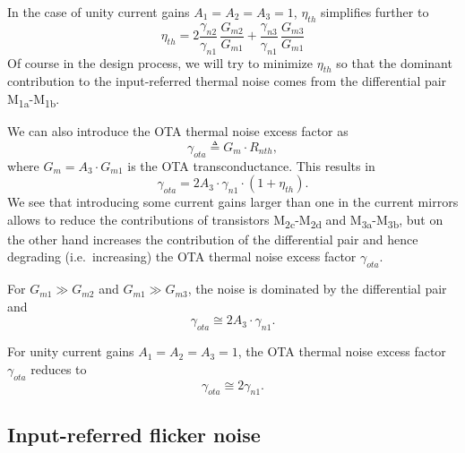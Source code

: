 \documentclass[
  a4paper,
  DIV=11,
  numbers=noendperiod]{scrreprt}
\begin{document}
In the case of unity current gains \(A_1=A_2=A_3=1\), \(\eta_{th}\)
simplifies further to \begin{equation}
  \eta_{th} = 2 \frac{\gamma_{n2}}{\gamma_{n1}}\,\frac{G_{m2}}{G_{m1}} + \frac{\gamma_{n3}}{\gamma_{n1}}\,\frac{G_{m3}}{G_{m1}}
\end{equation} Of course in the design process, we will try to minimize
\(\eta_{th}\) so that the dominant contribution to the input-referred
thermal noise comes from the differential pair
M\textsubscript{1a}-M\textsubscript{1b}.

We can also introduce the OTA thermal noise excess factor as
\begin{equation}
  \gamma_{ota} \triangleq G_m \cdot R_{nth},
\end{equation} where \(G_m = A_3 \cdot G_{m1}\) is the OTA
transconductance. This results in \begin{equation}
  \gamma_{ota} = 2 A_3 \cdot \gamma_{n1} \cdot (1 + \eta_{th}).
\end{equation} We see that introducing some current gains larger than
one in the current mirrors allows to reduce the contributions of
transistors M\textsubscript{2c}-M\textsubscript{2d} and
M\textsubscript{3a}-M\textsubscript{3b}, but on the other hand increases
the contribution of the differential pair and hence degrading
(i.e.~increasing) the OTA thermal noise excess factor \(\gamma_{ota}\).

For \(G_{m1} \gg G_{m2}\) and \(G_{m1} \gg G_{m3}\), the noise is
dominated by the differential pair and \begin{equation}
  \gamma_{ota} \cong 2 A_3 \cdot \gamma_{n1}.
\end{equation}

For unity current gains \(A_1=A_2=A_3=1\), the OTA thermal noise excess
factor \(\gamma_{ota}\) reduces to \begin{equation}
  \gamma_{ota} \cong 2 \gamma_{n1}.
\end{equation}

\subsection{Input-referred flicker
noise}\label{input-referred-flicker-noise}
\end{document}
